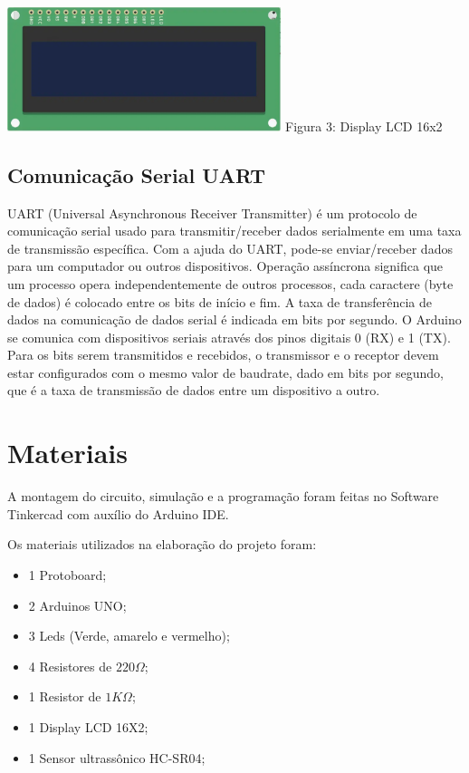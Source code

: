 \documentclass[conference]{IEEEtran}
\begin{document}
 \begin{center}
    \includegraphics[width=8cm]{LCD.png}
    Figura 3: Display LCD 16x2
\end{center}
\subsection{Comunicação Serial UART}
UART (Universal Asynchronous Receiver Transmitter) é um protocolo de comunicação serial usado para transmitir/receber dados serialmente em uma taxa de transmissão específica. Com a ajuda do UART, pode-se enviar/receber dados para um computador ou outros dispositivos. Operação assíncrona significa que um processo opera independentemente de outros processos, cada caractere (byte de dados) é colocado entre os bits de início e fim. A taxa de transferência de dados na comunicação de dados serial é indicada em bits por segundo. O Arduino se comunica com dispositivos seriais através dos pinos digitais 0 (RX) e 1 (TX). Para os bits serem transmitidos e recebidos, o transmissor e o receptor devem estar configurados com o mesmo valor de baudrate, dado em bits por segundo, que é a taxa de transmissão de dados entre um dispositivo a outro.
\section{Materiais}
A montagem do circuito, simulação e a programação foram feitas no Software Tinkercad com auxílio do Arduino IDE.

Os materiais utilizados na elaboração do projeto foram:

 \begin{itemize}
     \item 1 Protoboard; 
     \item 2 Arduinos UNO;
     \item 3 Leds (Verde, amarelo e vermelho);
     \item 4 Resistores de $ 220\Omega $;
     \item 1 Resistor de $ 1K\Omega $;
     \item 1 Display LCD 16X2;
     \item 1 Sensor ultrassônico HC-SR04;
 \end{itemize}
\end{document}
